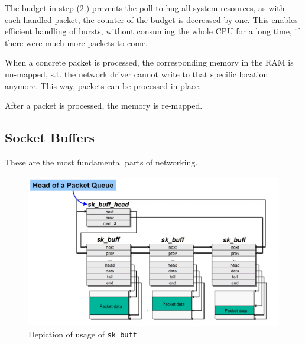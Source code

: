 \documentclass[english]{panikzettel}
\begin{document}
	The budget in step (2.) prevents the poll to hug all system resources, as with each handled packet, the counter of the budget is decreased by one.	
	This enables efficient handling of bursts, without consuming the whole CPU for a long time, if there were much more packets to come.

	When a concrete packet is processed, the corresponding memory in the RAM is un-mapped, s.t. the network driver cannot write to that specific location anymore. This way, packets can be processed in-place.

	After a packet is processed, the memory is re-mapped.

	\subsection{Socket Buffers}
	\label{ss-socket-buffers}
	
	These are the most fundamental parts of networking.

	\begin{figure}[H]
		\centering
		\includegraphics[width=\textwidth]{img/3-skbuff.png}
		\caption{Depiction of usage of \texttt{sk\_buff}}
		\label{img-3-skbuff}
	\end{figure}
\end{document}
